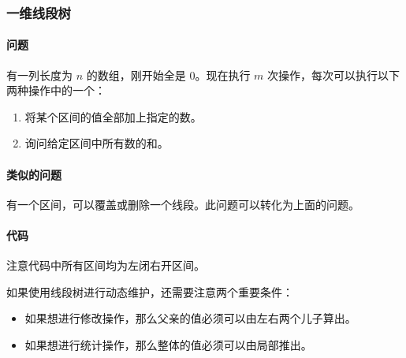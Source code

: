 %

\subsubsection{一维线段树}

	\paragraph{问题} 有一列长度为 $n$ 的数组，刚开始全是 0。现在执行 $m$ 次操作，每次可以执行以下两种操作中的一个：
	
	\begin{enumerate}
		\item 将某个区间的值全部加上指定的数。
		\item 询问给定区间中所有数的和。
	\end{enumerate}

	\paragraph{类似的问题} 有一个区间，可以覆盖或删除一个线段。此问题可以转化为上面的问题。

	\paragraph{代码} 注意代码中所有区间均为左闭右开区间。
	
	
	
	如果使用线段树进行动态维护，还需要注意两个重要条件：
	
	\begin{itemize}
		\item 如果想进行修改操作，那么父亲的值必须可以由左右两个儿子算出。
		\item 如果想进行统计操作，那么整体的值必须可以由局部推出。
	\end{itemize}
	